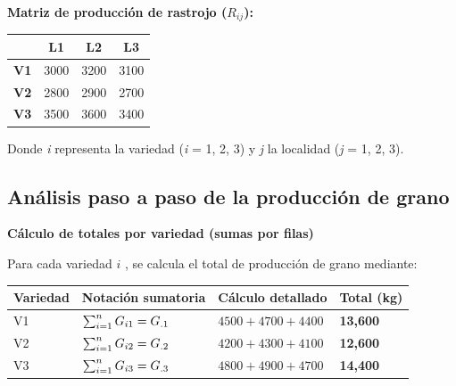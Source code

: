 \documentclass[
  spanish,
  letterpaper,
]{book}
\begin{document}
\textbf{Matriz de producción de rastrojo (}\(R_{ij}\)\textbf{):}

\begin{longtable}[]{@{}cccc@{}}
\toprule\noalign{}
& L1 & L2 & L3 \\
\midrule\noalign{}
\endhead
\bottomrule\noalign{}
\endlastfoot
\textbf{V1} & 3000 & 3200 & 3100 \\
\textbf{V2} & 2800 & 2900 & 2700 \\
\textbf{V3} & 3500 & 3600 & 3400 \\
\end{longtable}

Donde \emph{i} representa la variedad (\emph{i} = 1, 2, 3) y \emph{j} la
localidad (\emph{j} = 1, 2, 3).

\subsection{Análisis paso a paso de la producción de
grano}\label{anuxe1lisis-paso-a-paso-de-la-producciuxf3n-de-grano}

\textbf{Cálculo de totales por variedad (sumas por filas)}

Para cada variedad \(i\) , se calcula el total de producción de grano
mediante:

\begin{longtable}[]{@{}
  >{\centering\arraybackslash}p{}
  >{\centering\arraybackslash}p{}
  >{\centering\arraybackslash}p{}
  >{\centering\arraybackslash}p{}@{}}
\toprule\noalign{}
\begin{minipage}[b]{\linewidth}\centering
Variedad
\end{minipage} & \begin{minipage}[b]{\linewidth}\centering
Notación sumatoria
\end{minipage} & \begin{minipage}[b]{\linewidth}\centering
Cálculo detallado
\end{minipage} & \begin{minipage}[b]{\linewidth}\centering
Total (kg)
\end{minipage} \\
\midrule\noalign{}
\endhead
\bottomrule\noalign{}
\endlastfoot
V1 & \(\large \sum_{i=1}^{n} G_{i1} = G_{.1} \) & \(4500 + 4700 + 4400\)
& \textbf{13,600} \\
V2 & \(\large \sum_{i=1}^{n} G_{i2} = G_{.2} \) & \(4200 + 4300 + 4100\)
& \textbf{12,600} \\
V3 & \(\large \sum_{i=1}^{n} G_{i3} = G_{.3} \) & \(4800 + 4900 + 4700\)
& \textbf{14,400} \\
\end{longtable}
\end{document}
